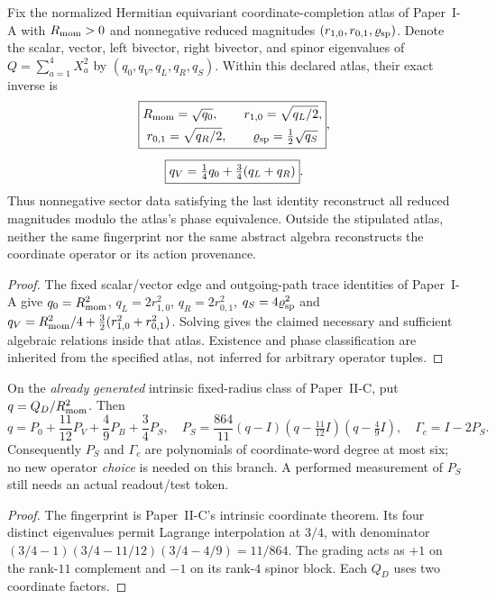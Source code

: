 \documentclass[12pt,a4paper]{article}
\begin{document}
\begin{proposition}
\label{p2b:prop:v264-quadratic-inversion}
Fix the normalized Hermitian equivariant coordinate-completion atlas
of Paper~I-A with $R_{\rm mom}>0$ and nonnegative reduced magnitudes
$(r_{1,0},r_{0,1},\varrho_{\rm sp})$. Denote the scalar, vector, left
bivector, right bivector, and spinor eigenvalues of
$Q=\sum_{a=1}^{4}X_a^2$ by $(q_0,q_V,q_L,q_R,q_S)$.
Within this declared atlas, their exact inverse is
\[
\begin{gathered}
 \boxed{\begin{gathered}
  R_{\rm mom}=\sqrt{q_0},\qquad r_{1,0}=\sqrt{q_L/2},\\
  r_{0,1}=\sqrt{q_R/2},\qquad \varrho_{\rm sp}=\tfrac12\sqrt{q_S}
 \end{gathered}},\\[5pt]
 \boxed{q_V=\tfrac14q_0+\tfrac34(q_L+q_R)}.
\end{gathered}
\]
Thus nonnegative sector data satisfying the last identity reconstruct
all reduced magnitudes modulo the atlas's phase equivalence. Outside
the stipulated atlas, neither the same fingerprint nor the same abstract
algebra reconstructs the coordinate operator or its action provenance.
\end{proposition}
\begin{proof}
The fixed scalar/vector edge and outgoing-path trace identities
of Paper~I-A give
$q_0=R_{\rm mom}^2$, $q_L=2r_{1,0}^2$,
$q_R=2r_{0,1}^2$, $q_S=4\varrho_{\rm sp}^2$ and
$q_V=R_{\rm mom}^2/4+\tfrac32(r_{1,0}^2+r_{0,1}^2)$.
Solving gives the claimed necessary and sufficient algebraic relations
inside that atlas. Existence and phase classification are inherited
from the specified atlas, not inferred for arbitrary operator tuples.
\end{proof}

\begin{corollary}
\label{p2b:cor:v264-central-polynomial}
On the \emph{already generated} intrinsic fixed-radius class of
Paper~II-C, put $q=Q_D/R_{\rm mom}^2$. Then
\[
 q=P_0+\frac{11}{12}P_V+\frac49P_B+\frac34P_S,
\quad
\boxed{P_S=\frac{864}{11}(q-I)
 (q-\tfrac{11}{12}I)(q-\tfrac49I),\quad
 \Gamma_c=I-2P_S.}
\]
Consequently $P_S$ and $\Gamma_c$ are polynomials of coordinate-word
degree at most six; no new operator \emph{choice} is needed on this branch.
A performed measurement of $P_S$ still needs an actual readout/test token.
\end{corollary}
\begin{proof}
The fingerprint is Paper~II-C's intrinsic coordinate theorem.
Its four distinct eigenvalues permit Lagrange interpolation at
$3/4$, with denominator
$(3/4-1)(3/4-11/12)(3/4-4/9)=11/864$.
The grading acts as $+1$ on the rank-$11$ complement and $-1$ on
its rank-$4$ spinor block. Each $Q_D$ uses two coordinate factors.
\end{proof}
\end{document}
